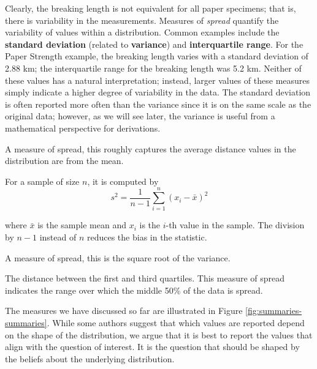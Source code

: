 \documentclass[]{book}
\theoremstyle{definition}
\theoremstyle{definition}
\theoremstyle{definition}
\theoremstyle{remark}
\let\BeginKnitrBlock\begin \let\EndKnitrBlock\end
\begin{document}
Clearly, the breaking length is not equivalent for all paper specimens;
that is, there is variability in the measurements. Measures of
\emph{spread} quantify the variability of values within a distribution.
Common examples include the \textbf{standard deviation} (related to
\textbf{variance}) and \textbf{interquartile range}. For the Paper
Strength example, the breaking length varies with a standard deviation
of 2.88 km; the interquartile range for the breaking length was 5.2 km.
Neither of these values has a natural interpretation; instead, larger
values of these measures simply indicate a higher degree of variability
in the data. The standard deviation is often reported more often than
the variance since it is on the same scale as the original data;
however, as we will see later, the variance is useful from a
mathematical perspective for derivations.

\BeginKnitrBlock{definition}[Variance]
\protect\hypertarget{def:defn-variance}{}{\label{def:defn-variance}
{} }A measure of spread, this roughly captures
the average distance values in the distribution are from the mean.

For a sample of size \(n\), it is computed by
\[s^2 = \frac{1}{n-1}\sum_{i=1}^{n} \left(x_i - \bar{x}\right)^2\]

where \(\bar{x}\) is the sample mean and \(x_i\) is the \(i\)-th value
in the sample. The division by \(n-1\) instead of \(n\) reduces the bias
in the statistic.
\EndKnitrBlock{definition}

\BeginKnitrBlock{definition}[Standard Deviation]
\protect\hypertarget{def:defn-standard-deviation}{}{\label{def:defn-standard-deviation}
{} }A measure of spread, this is the
square root of the variance.
\EndKnitrBlock{definition}

\BeginKnitrBlock{definition}[Interquartile Range]
\protect\hypertarget{def:defn-interquartile-range}{}{\label{def:defn-interquartile-range}
{} }The distance between the first and
third quartiles. This measure of spread indicates the range over which
the middle 50\% of the data is spread.
\EndKnitrBlock{definition}

The measures we have discussed so far are illustrated in Figure
\ref{fig:summaries-summaries}. While some authors suggest that which
values are reported depend on the shape of the distribution, we argue
that it is best to report the values that align with the question of
interest. It is the question that should be shaped by the beliefs about
the underlying distribution.
\end{document}
